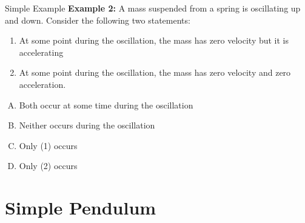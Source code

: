 \documentclass[12pt,compress,aspectratio=169]{beamer}
\begin{document}
\begin{frame}{Simple Example}
  \textbf{Example 2:} A mass suspended from a spring is oscillating up and
  down. Consider the following two statements:
  \begin{enumerate}
  \item At some point during the oscillation, the mass has zero velocity but it
    is accelerating
  \item At some point during the oscillation, the mass has zero velocity and
    zero acceleration.
  \end{enumerate}

  \begin{enumerate}[(A)]
  \item Both occur at some time during the oscillation
  \item Neither occurs during the oscillation
  \item Only (1) occurs
  \item Only (2) occurs
  \end{enumerate}
\end{frame}






\section{Simple Pendulum}
\end{document}
